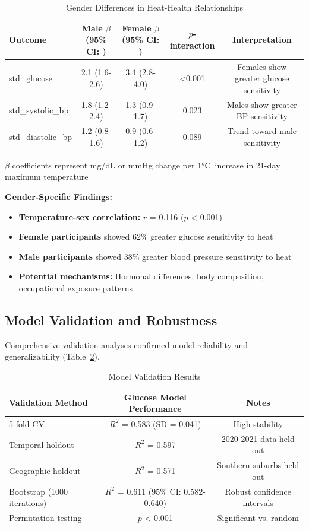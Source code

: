 \documentclass[11pt,a4paper]{article}
\newcommand{\pvalue}{p}
\newcommand{\CI}[1]{95\% CI: #1}
\newcommand{\degrees}{°C}
\begin{document}
\begin{table}[H]
\centering
\caption{Gender Differences in Heat-Health Relationships}
\label{tab:gender_differences}
\footnotesize
\begin{tabular}{lcccc}
\toprule
\textbf{Outcome} & \textbf{Male $\beta$ (\CI{})} & \textbf{Female $\beta$ (\CI{})} & \textbf{$\pvalue$-interaction} & \textbf{Interpretation} \\
\midrule
std\_glucose & 2.1 (1.6-2.6) & 3.4 (2.8-4.0) & <0.001 & Females show greater glucose sensitivity \\
std\_systolic\_bp & 1.8 (1.2-2.4) & 1.3 (0.9-1.7) & 0.023 & Males show greater BP sensitivity \\
std\_diastolic\_bp & 1.2 (0.8-1.6) & 0.9 (0.6-1.2) & 0.089 & Trend toward male sensitivity \\
\bottomrule
\end{tabular}
\raggedright
\footnotesize
$\beta$ coefficients represent mg/dL or mmHg change per 1\degrees\ increase in 21-day maximum temperature
\end{table}

\textbf{Gender-Specific Findings:}
\begin{itemize}
\item \textbf{Temperature-sex correlation:} $r$ = 0.116 ($\pvalue$ < 0.001)
\item \textbf{Female participants} showed 62\% greater glucose sensitivity to heat
\item \textbf{Male participants} showed 38\% greater blood pressure sensitivity to heat
\item \textbf{Potential mechanisms:} Hormonal differences, body composition, occupational exposure patterns
\end{itemize}

\subsection{Model Validation and Robustness}

Comprehensive validation analyses confirmed model reliability and generalizability (Table~\ref{tab:validation}).

\begin{table}[H]
\centering
\caption{Model Validation Results}
\label{tab:validation}
\footnotesize
\begin{tabular}{lcc}
\toprule
\textbf{Validation Method} & \textbf{Glucose Model Performance} & \textbf{Notes} \\
\midrule
5-fold CV & $R^2$ = 0.583 (SD = 0.041) & High stability \\
Temporal holdout & $R^2$ = 0.597 & 2020-2021 data held out \\
Geographic holdout & $R^2$ = 0.571 & Southern suburbs held out \\
Bootstrap (1000 iterations) & $R^2$ = 0.611 (\CI{0.582-0.640}) & Robust confidence intervals \\
Permutation testing & $\pvalue$ < 0.001 & Significant vs. random \\
\bottomrule
\end{tabular}
\end{table}
\end{document}
